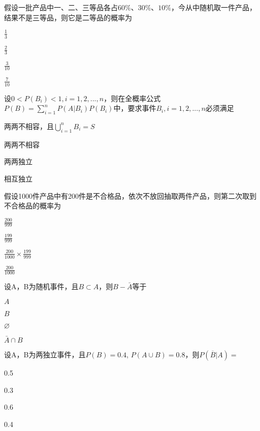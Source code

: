 \documentclass{exam-zh}
\begin{document}
\begin{question}
  假设一批产品中一、二、三等品各占$60\%$、$30\%$、$10\%$，今从中随机取一件产品，结果不是三等品，则它是二等品的概率为 \paren[A]
  \begin{choices}
   \item $\frac{1}{3}$
   \item $\frac{2}{3}$
   \item $\frac{3}{10}$
   \item $\frac{7}{10}$
  \end{choices}
\end{question}

\begin{question}
  设$0<P(B_i)<1,i=1,2,...,n$，则在全概率公式$P\left( B \right) =\sum_{i=1}^n{P\left( A|B_i \right) P\left( B_i \right)}$中，要求事件$B_i,i=1,2,...,n$必须满足 \paren[A]
  \begin{choices}
   \item 两两不相容，且$\bigcup_{i=1}^n{B_i=S}$
   \item 两两不相容
   \item 两两独立
   \item 相互独立
  \end{choices}
\end{question}

\begin{question}
  假设1000件产品中有200件是不合格品，依次不放回抽取两件产品，则第二次取到不合格品的概率为 \paren[D]
  \begin{choices}
   \item $\frac{200}{999}$
   \item $\frac{199}{999}$
   \item $\frac{200}{1000} \times \frac{199}{999}$
   \item $\frac{200}{1000}$
  \end{choices}
\end{question}

\begin{question}
  设A，B为随机事件，且$B\subset A$，则$B-\bar{A}$等于\paren[B]
  \begin{choices}
   \item $A$
   \item $B$
   \item $\diameter$
   \item $\bar{A}\cap B$
  \end{choices}
\end{question}

\begin{question}
  设A，B为两独立事件，且$P(B)=0.4$, $P(A\cup B)=0.8$，则$P(\overline{B}|A)=$ \paren[C]
  \begin{choices}
   \item 0.5
   \item 0.3
   \item 0.6
   \item 0.4
  \end{choices}
\end{question}
\end{document}

